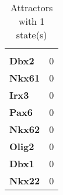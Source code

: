 

\begin{table}[ht]
\begin{center}
\caption{Attractors with 1 state(s)}
\begin{tabularx}{\linewidth}{l>{\centering\arraybackslash}X}\hline
	&	 \multicolumn{1}{c}{Attr. 1} \\
\textbf{Dbx2}	&	\cellcolor[gray]{0.6}0\\
\textbf{Nkx61}	&	\cellcolor[gray]{0.6}0\\
\textbf{Irx3}	&	\cellcolor[gray]{0.6}0\\
\textbf{Pax6}	&	\cellcolor[gray]{0.6}0\\
\textbf{Nkx62}	&	\cellcolor[gray]{0.6}0\\
\textbf{Olig2}	&	\cellcolor[gray]{0.6}0\\
\textbf{Dbx1}	&	\cellcolor[gray]{0.6}0\\
\textbf{Nkx22}	&	\cellcolor[gray]{0.6}0\\
\hline\end{tabularx}
\end{center}
\end{table}

